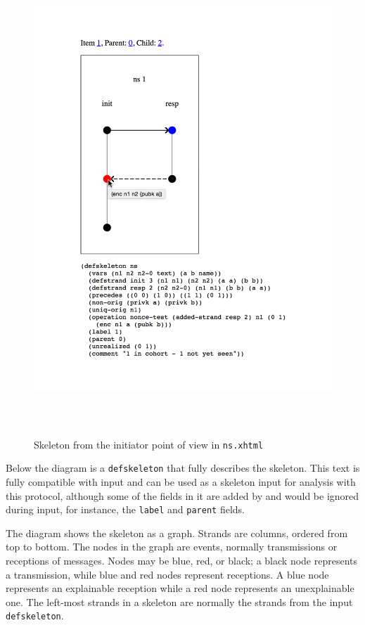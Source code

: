 \begin{figure}
\centering
\includegraphics[height=7in]{ns_skel1_cursor}
\caption[Needham-Schroeder skeleton]{Skeleton from the initiator point
  of view in \texttt{ns.xhtml}}
\label{fig:ns skel1}
\end{figure}

Below the diagram is a \texttt{defskeleton} that fully describes the
skeleton.  This text is fully compatible with {\cpsa} input and can be
used as a skeleton input for analysis with this protocol, although
some of the fields in it are added by {\cpsa} and would be ignored
during input, for instance, the \texttt{label} and \texttt{parent}
fields.

The diagram shows the skeleton as a graph.  Strands are columns,
ordered from top to bottom.  The nodes in the graph are events,
normally transmissions or receptions of messages.  Nodes may be blue,
red, or black; a black node represents a transmission, while blue and
red nodes represent receptions.  A blue node represents an explainable
reception while a red node represents an unexplainable one.  The
left-most strands in a skeleton are normally the strands from the
input \texttt{defskeleton}.

